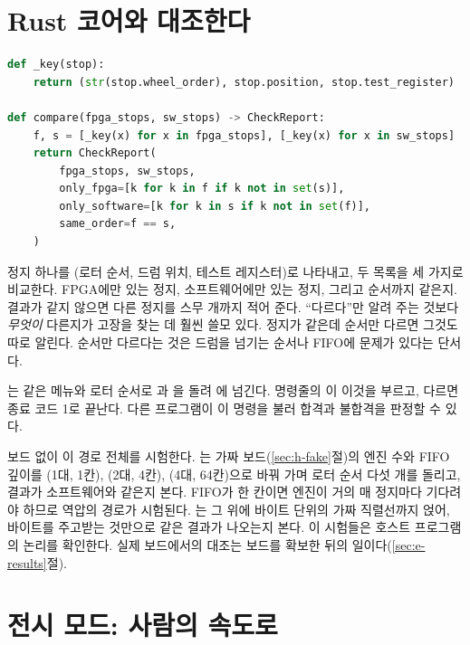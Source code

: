 \section{Rust 코어와 대조한다}\label{sec:h-check}

\begin{lstlisting}[language=Python,caption={\code{check.py}: 정지 목록의 비교.},label={lst:h-compare}]
def _key(stop):
    return (str(stop.wheel_order), stop.position, stop.test_register)

def compare(fpga_stops, sw_stops) -> CheckReport:
    f, s = [_key(x) for x in fpga_stops], [_key(x) for x in sw_stops]
    return CheckReport(
        fpga_stops, sw_stops,
        only_fpga=[k for k in f if k not in set(s)],
        only_software=[k for k in s if k not in set(f)],
        same_order=f == s,
    )
\end{lstlisting}

정지 하나를 (로터 순서, 드럼 위치, 테스트 레지스터)로 나타내고, 두 목록을 세 가지로 비교한다. FPGA에만 있는
정지, 소프트웨어에만 있는 정지, 그리고 순서까지 같은지. 결과가 같지 않으면 다른 정지를 스무 개까지 적어 준다.
``다르다''만 알려 주는 것보다 \emph{무엇이} 다른지가 고장을 찾는 데 훨씬 쓸모 있다. 정지가 같은데 순서만
다르면 그것도 따로 알린다. 순서만 다르다는 것은 드럼을 넘기는 순서나 FIFO에 문제가 있다는 단서다.

는 같은 메뉴와 로터 순서로 과 을 돌려 에
넘긴다. 명령줄의 이
이것을 부르고, 다르면 종료 코드 1로 끝난다. 다른 프로그램이 이 명령을 불러 합격과 불합격을 판정할 수 있다.

\Ours 보드 없이 이 경로 전체를 시험한다. 는 가짜 보드(\ref{sec:h-fake}절)의 엔진
수와 FIFO 깊이를 (1대, 1칸), (2대, 4칸), (4대, 64칸)으로 바꿔 가며 로터 순서 다섯 개를 돌리고, 결과가 소프트웨어와
같은지 본다. FIFO가 한 칸이면 엔진이 거의 매 정지마다 기다려야 하므로 역압의 경로가 시험된다.
는 그 위에 바이트 단위의 가짜 직렬선까지 얹어, 바이트를 주고받는 것만으로
같은 결과가 나오는지 본다. 이 시험들은 호스트 프로그램의 논리를 확인한다. 실제 보드에서의 대조는 보드를 확보한
뒤의 일이다(\ref{sec:e-results}절).

\section{전시 모드: 사람의 속도로}\label{sec:h-exhibit}

